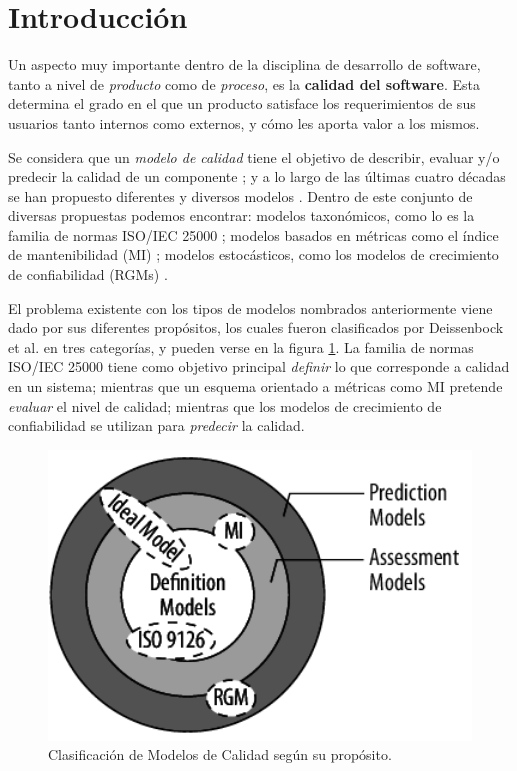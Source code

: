 \section{Introducción}

Un aspecto muy importante dentro de la disciplina de desarrollo de software, tanto
a nivel de \textit{producto} como de \textit{proceso}, es la \textbf{calidad del
software}.
Esta determina el grado en el que un producto satisface los requerimientos de sus usuarios
tanto internos como externos, y cómo les aporta valor a los mismos.

Se considera que un \textit{modelo de calidad} tiene el objetivo de describir, evaluar y/o
predecir la calidad de un componente \cite{Wagner2013}; y a lo largo de las últimas cuatro
décadas se han propuesto diferentes y diversos modelos \cite{Deissenboeck2009}.
Dentro de este conjunto de diversas propuestas podemos encontrar: modelos taxonómicos, como
lo es la familia de normas ISO/IEC 25000 \cite{iso25000}; modelos basados en métricas como el
índice de mantenibilidad (MI) \cite{Coleman1995}; modelos estocásticos, como los modelos de
crecimiento de confiabilidad (RGMs) \cite{Lyu1996}.

El problema existente con los tipos de modelos nombrados anteriormente viene dado por sus
diferentes propósitos, los cuales fueron clasificados por Deissenbock et al. \cite{Deissenboeck2009}
en tres categorías, y pueden verse en la figura \ref{DAPModels}.
La familia de normas ISO/IEC 25000 tiene como objetivo principal \textit{definir} lo que
corresponde a calidad en un sistema; mientras que un esquema orientado a métricas como MI
pretende \textit{evaluar} el nivel de calidad; mientras que los modelos de crecimiento de
confiabilidad se utilizan para \textit{predecir} la calidad.

\begin{figure}
    \label{DAPModels}
    \includegraphics[width=12cm]{quality_metrics/dap_models.png}
    \centering
    \caption{Clasificación de Modelos de Calidad según su propósito.}
\end{figure}


